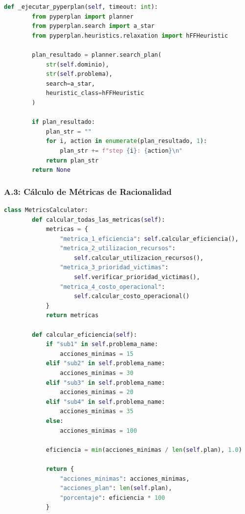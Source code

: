 \documentclass[conference]{IEEEtran}
\begin{document}
    \begin{lstlisting}[style=anexostyle,language=Python,caption={Integración con el planificador Pyperplan}]
    def _ejecutar_pyperplan(self, timeout: int):
        from pyperplan import planner
        from pyperplan.search import a_star
        from pyperplan.heuristics.relaxation import hFFHeuristic
        
        plan_resultado = planner.search_plan(
            str(self.dominio),
            str(self.problema),
            search=a_star,
            heuristic_class=hFFHeuristic
        )
        
        if plan_resultado:
            plan_str = ""
            for i, action in enumerate(plan_resultado, 1):
                plan_str += f"step {i}: {action}\n"
            return plan_str
        return None
    \end{lstlisting}

    \subsubsection*{A.3: Cálculo de Métricas de Racionalidad}

    \begin{lstlisting}[style=anexostyle,language=Python,caption={Cálculo de las 4 métricas de racionalidad}]
    class MetricsCalculator:
        def calcular_todas_las_metricas(self):
            metricas = {
                "metrica_1_eficiencia": self.calcular_eficiencia(),
                "metrica_2_utilizacion_recursos": 
                    self.calcular_utilizacion_recursos(),
                "metrica_3_prioridad_victimas": 
                    self.verificar_prioridad_victimas(),
                "metrica_4_costo_operacional": 
                    self.calcular_costo_operacional()
            }
            return metricas
        
        def calcular_eficiencia(self):
            if "sub1" in self.problema_name:
                acciones_minimas = 15
            elif "sub2" in self.problema_name:
                acciones_minimas = 30
            elif "sub3" in self.problema_name:
                acciones_minimas = 20
            elif "sub4" in self.problema_name:
                acciones_minimas = 35
            else:
                acciones_minimas = 100
            
            eficiencia = min(acciones_minimas / len(self.plan), 1.0)
            
            return {
                "acciones_minimas": acciones_minimas,
                "acciones_plan": len(self.plan),
                "porcentaje": eficiencia * 100
            }
    \end{lstlisting}
\end{document}
